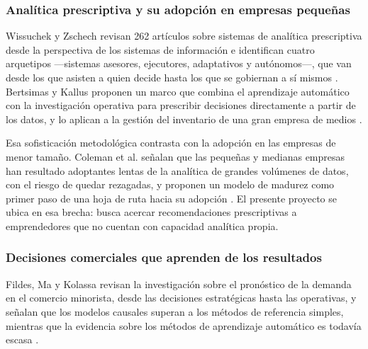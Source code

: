 \subsubsection{Analítica prescriptiva y su adopción en empresas pequeñas}
\label{sec:antecedentes-prescriptiva}

Wissuchek y Zschech revisan 262 artículos sobre sistemas de analítica prescriptiva desde la perspectiva de los sistemas de información e identifican cuatro arquetipos ---sistemas asesores, ejecutores, adaptativos y autónomos---, que van desde los que asisten a quien decide hasta los que se gobiernan a sí mismos \parencite{Wissuchek2024}. Bertsimas y Kallus proponen un marco que combina el aprendizaje automático con la investigación operativa para prescribir decisiones directamente a partir de los datos, y lo aplican a la gestión del inventario de una gran empresa de medios \parencite{Bertsimas2020}.

Esa sofisticación metodológica contrasta con la adopción en las empresas de menor tamaño. Coleman et al. señalan que las pequeñas y medianas empresas han resultado adoptantes lentas de la analítica de grandes volúmenes de datos, con el riesgo de quedar rezagadas, y proponen un modelo de madurez como primer paso de una hoja de ruta hacia su adopción \parencite{Coleman2016}. El presente proyecto se ubica en esa brecha: busca acercar recomendaciones prescriptivas a emprendedores que no cuentan con capacidad analítica propia.

\subsubsection{Decisiones comerciales que aprenden de los resultados}
\label{sec:antecedentes-aprendizaje}

Fildes, Ma y Kolassa revisan la investigación sobre el pronóstico de la demanda en el comercio minorista, desde las decisiones estratégicas hasta las operativas, y señalan que los modelos causales superan a los métodos de referencia simples, mientras que la evidencia sobre los métodos de aprendizaje automático es todavía escasa \parencite{Fildes2022}.

